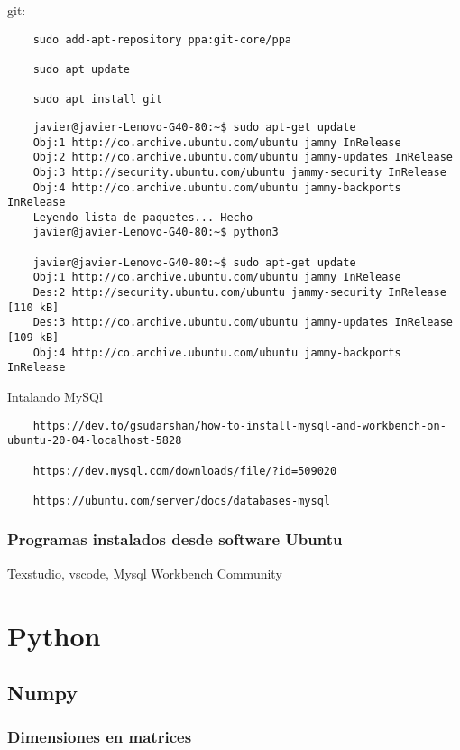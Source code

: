 git: 
\begin{verbatim}
	sudo add-apt-repository ppa:git-core/ppa 
	
	sudo apt update 
	
	sudo apt install git
\end{verbatim}
\begin{verbatim}
	javier@javier-Lenovo-G40-80:~$ sudo apt-get update
	Obj:1 http://co.archive.ubuntu.com/ubuntu jammy InRelease
	Obj:2 http://co.archive.ubuntu.com/ubuntu jammy-updates InRelease
	Obj:3 http://security.ubuntu.com/ubuntu jammy-security InRelease
	Obj:4 http://co.archive.ubuntu.com/ubuntu jammy-backports InRelease
	Leyendo lista de paquetes... Hecho
	javier@javier-Lenovo-G40-80:~$ python3
	
	javier@javier-Lenovo-G40-80:~$ sudo apt-get update
	Obj:1 http://co.archive.ubuntu.com/ubuntu jammy InRelease
	Des:2 http://security.ubuntu.com/ubuntu jammy-security InRelease [110 kB]
	Des:3 http://co.archive.ubuntu.com/ubuntu jammy-updates InRelease [109 kB]
	Obj:4 http://co.archive.ubuntu.com/ubuntu jammy-backports InRelease	
\end{verbatim}

Intalando MySQl 

\begin{verbatim}
	https://dev.to/gsudarshan/how-to-install-mysql-and-workbench-on-ubuntu-20-04-localhost-5828 
	
	https://dev.mysql.com/downloads/file/?id=509020 
	
	https://ubuntu.com/server/docs/databases-mysql
\end{verbatim}


\section{Programas instalados desde software Ubuntu}
Texstudio, vscode, Mysql Workbench Community

\part{Python}

\chapter{Numpy}

\section{Dimensiones en matrices}


